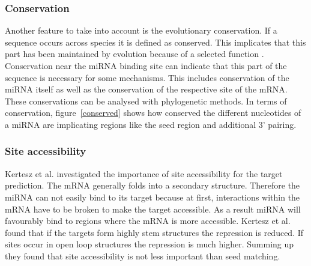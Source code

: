 \documentclass[12pt]{article}
\begin{document}
\subsubsection{Conservation}
Another feature to take into account is the evolutionary conservation. If a sequence occurs across species it is defined as conserved. This implicates that this part has been maintained by evolution because of a selected function \cite{Peterson}. Conservation near the miRNA binding site can indicate that this part of the sequence is necessary for some mechanisms. This includes conservation of the miRNA itself as well as the conservation of the respective site of the mRNA. These conservations can be analysed with phylogenetic methods. In terms of conservation, figure~\ref{conserved} shows how conserved the different nucleotides of a miRNA are implicating regions like the seed region and additional 3' pairing. 


\subsubsection{Site accessibility}
Kertesz et al. \cite{Kertesz} investigated the importance of site accessibility for the target prediction. The mRNA generally folds into a secondary structure. Therefore the miRNA can not easily bind to its target because at first, interactions within the mRNA have to be broken to make the target accessible. As a result miRNA will favourably bind to regions where the mRNA is more accessible. Kertesz et al. \cite{Kertesz} found that if the targets form highly stem structures the repression is reduced. If sites occur in open loop structures the repression is much higher. Summing up they found that site accessibility is not less important than seed matching. \\
\end{document}
